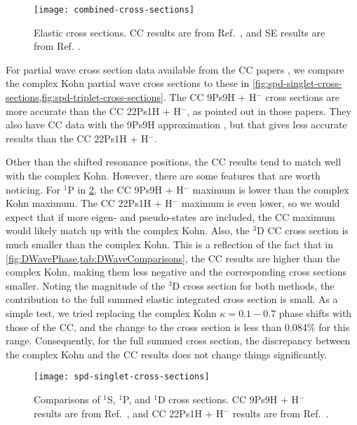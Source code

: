 \documentclass[Dissertation.tex]{subfiles}
\begin{document}
\begin{figure}
	\centering
	\texttt{[image: combined-cross-sections]}
	\caption[Cross sections]{Elastic cross sections. CC results are from Ref.~\cite{Walters2004}, and SE results are from Ref. \cite{Hara1975}.}
	\label{fig:combined-cross-sections}
\end{figure}

For partial wave cross section data available from the CC papers
\cite{Walters2004,Blackwood2002,Blackwood2002b}, we compare the complex Kohn
partial wave cross sections to these in
\cref{fig:spd-singlet-cross-sections,fig:spd-triplet-cross-sections}.
The CC 9Ps9H + H$^-$ cross sections are more accurate than the CC 22Ps1H + H$^-$,
as pointed out in those papers. They also have CC data with the 9Ps9H
approximation \cite{Blackwood2002}, but that gives less accurate results than
the CC 22Ps1H + H$^-$.

Other than the shifted resonance positions, the CC results tend to match well
with the complex Kohn. However, there are some features that are worth
noticing. For $^1$P in \cref{fig:spd-singlet-cross-sections}, the CC
9Ps9H + H$^-$ maximum is lower than the complex Kohn maximum. The CC
22Ps1H + H$^-$ maximum is even lower, so we would expect that if more
eigen- and pseudo-states are included, the CC maximum would likely match up 
with the complex Kohn. Also, the $^3$D CC cross section is much smaller than
the complex Kohn. This is a reflection of the fact that in
\cref{fig:DWavePhase,tab:DWaveComparisons}, the CC results are higher than the
complex Kohn, making them less negative and the corresponding cross sections
smaller. Noting the magnitude of the $^3$D cross section for both methods, the
contribution to the full summed elastic integrated cross section is small.
As a simple test, we tried replacing the complex Kohn $\kappa = 0.1 - 0.7$
phase shifts with those of the CC, and the change to the cross section is
less than 0.084\% for this range. Consequently, for the full summed
cross section, the discrepancy between the complex Kohn and the CC results
does not change things significantly.

\begin{figure}
	\centering
	\texttt{[image: spd-singlet-cross-sections]}
	\caption[Comparisons of $^1$S, $^1$P, and $^1$D cross sections.]{Comparisons of $^1$S, $^1$P, and $^1$D cross sections. CC 9Ps9H + H$^-$ results are from Ref.~\cite{Walters2004}, and CC 22Ps1H + H$^-$ results are from Ref.~\cite{Blackwood2002b}.}
	\label{fig:spd-singlet-cross-sections}
\end{figure}
\end{document}
